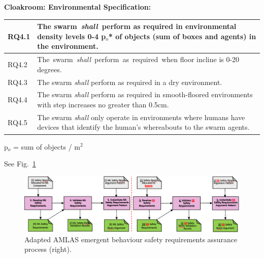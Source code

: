 \documentclass[lettersize,journal]{IEEEtran}
\begin{document}
\noindent \textbf{Cloakroom: Environmental Specification: }
\begin{center}
	\begin{tabular}{|p{7mm}|p{72mm}|}
		\hline
		RQ4.1 & The swarm \emph{shall} perform as required in environmental density levels 0-4 p$_o$* of objects (sum of boxes and agents) in the environment.
		\\ 
		\hline
		RQ4.2 & The swarm \emph{shall} perform as required when floor incline is 0-20 degrees.
		\\ 
		\hline
		RQ4.3 & The swarm \emph{shall} perform as required in a dry environment.
		\\ 
		\hline
		RQ4.4 & The swarm \emph{shall} perform as required in smooth-floored environments with step increases no greater than 0.5cm.
		\\ 
		\hline
		RQ4.5 & The swarm \emph{shall} only operate in environments where humans have devices that identify the human’s whereabouts to the swarm agents.
		\\		[1ex] 		
		\hline
	\end{tabular}
\end{center}
\noindent *p$_o$ = sum of objects  / m$^2$



See Fig.~\ref{amlas-a-stage2}
\begin{figure}
	\centering
	\includegraphics[width=1.0\textwidth]{figures/amlas-a-stage2.png}
	\caption{Adapted AMLAS emergent behaviour safety requirements assurance process (right).}
	\label{amlas-a-stage2}
\end{figure}
\end{document}
